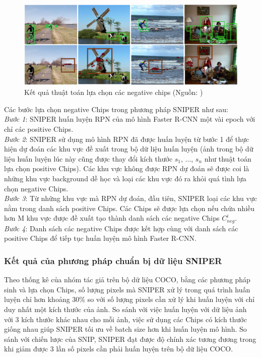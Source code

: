 {    \begin{figure}[H]
        \centering
        \includegraphics[width=13cm] {images/sniper_neg_chip}
        \caption{Kết quả thuật toán lựa chọn các negative chips (Nguồn: \cite{singh2018sniper})}
        \label{fig:sniper_pos_chip}
    \end{figure}

    \noindent
    Các bước lựa chọn negative Chips trong phương pháp SNIPER  như sau: \\
    \textit{Bước 1}: SNIPER  huấn luyện RPN của mô hình Faster R-CNN một vài epoch với chỉ các positive Chips. \\
    \textit{Bước 2}: SNIPER  sử dụng mô hình RPN đã được huấn luyện từ bước 1 để thực hiện dự đoán các khu vực đề xuất trong bộ dữ liệu huấn luyện (ảnh trong bộ dữ liệu huấn luyện lúc này cũng được thay đổi kích thước {${s}_{1}$, ..., ${s}_{n}$} như thuật toán lựa chọn positive Chips).
    Các khu vực không được RPN dự đoán sẽ được coi là những khu vực background  dễ học và loại các khu vực đó ra khỏi quá tình lựa chọn negative Chips. \\
    \textit{Bước 3}: Từ những khu vực mà RPN dự đoán, đầu tiên, SNIPER  loại các khu vực nằm trong danh sách positive Chips.
    Các Chips sẽ được lựa chọn nếu chứa nhiều hơn M khu vực được đề xuất tạo thành danh sách các negative Chips ${C}_{neg}^{i}$. \\
    \textit{Bước 4}: Danh sách các negative Chips được kết hợp cùng với danh sách các positive Chips để tiếp tục huấn luyện mô hình Faster R-CNN.

    \subsubsection*{Kết quả của phương pháp chuẩn bị dữ liệu SNIPER }
    Theo thống kê của nhóm tác giả trên bộ dữ liệu COCO, bằng các phương pháp sinh và lựa chọn Chips, số lượng pixels  mà SNIPER  xử lý trong quá trình huấn luyện chỉ hơn khoảng 30\% so với số lượng pixels  cần xử lý khi huấn luyện với chỉ duy nhất một kích thước của ảnh.
    So sánh với việc huấn luyện với dữ liệu ảnh với 3 kích thước khác nhau cho mỗi ảnh, việc sử dụng các Chips có kích thước giống nhau giúp SNIPER  tối ưu về batch size hơn khi huấn luyện mô hình.
    So sánh với chiến lược của SNIP, SNIPER  đạt được độ chính xác tương đương trong khi giảm được 3 lần số pixels  cần phải huấn luyện trên bộ dữ liệu COCO.

}
